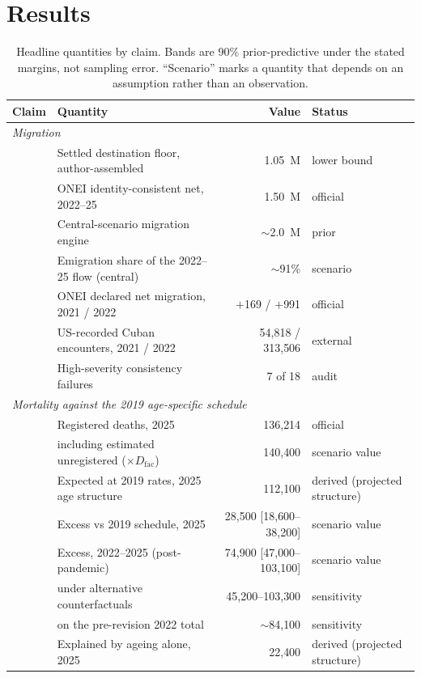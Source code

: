 \documentclass[11pt,a4paper]{article}
\begin{document}
\section{Results}

\begin{table}[ht]
\centering
\small
\caption{Headline quantities by claim. Bands are 90\% prior-predictive under the
stated margins, not sampling error. ``Scenario'' marks a quantity that depends on
an assumption rather than an observation.}
\label{tab:headline}
\begin{tabular}{llrl}
\toprule
Claim & Quantity & Value & Status \\
\midrule
\multicolumn{4}{l}{\textit{Migration}} \\
& Settled destination floor, author-assembled & 1.05~M & lower bound \\
& ONEI identity-consistent net, 2022--25 & 1.50~M & official \\
& Central-scenario migration engine & $\sim$2.0~M & prior \\
& Emigration share of the 2022--25 flow (central) & $\sim$91\% & scenario \\
& ONEI declared net migration, 2021 / 2022 & $+$169 / $+$991 & official \\
& US-recorded Cuban encounters, 2021 / 2022 & 54{,}818 / 313{,}506 & external \\
& High-severity consistency failures & 7 of 18 & audit \\
\midrule
\multicolumn{4}{l}{\textit{Mortality against the 2019 age-specific schedule}} \\
& Registered deaths, 2025 & 136{,}214 & official \\
& \quad including estimated unregistered ($\times D_{\mathrm{fac}}$) & 140{,}400 & scenario value \\
& Expected at 2019 rates, 2025 age structure & 112{,}100 & derived (projected structure) \\
& Excess vs 2019 schedule, 2025 & 28{,}500 [18{,}600--38{,}200] & scenario value \\
& Excess, 2022--2025 (post-pandemic) & 74{,}900 [47{,}000--103{,}100] & scenario value \\
& \quad under alternative counterfactuals & 45{,}200--103{,}300 & sensitivity \\
& \quad on the pre-revision 2022 total & $\sim$84{,}100 & sensitivity \\
& Explained by ageing alone, 2025 & 22{,}400 & derived (projected structure) \\

\end{tabular}
\end{table}
\end{document}
